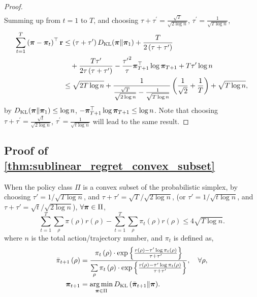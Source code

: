 \begin{proof}
\begin{equation*}
\begin{split}
\end{split}
\end{equation*}
Summing up from $t = 1$ to $T$, and choosing $\tau + \tau^\prime = \frac{\sqrt{T}}{\sqrt{2 \log{n}}}$, $\tau^\prime = \frac{1}{\sqrt{T \log{n}}}$,
\begin{equation*}
\begin{split}
    \sum\limits_{t=1}^{T}{\left( {\boldsymbol{\pi}} - {\boldsymbol{\pi}}_t \right)^\top {\mathbf{r}} } &\le \left(\tau + \tau^\prime\right) D_{\mathrm{KL}}{\left( {\boldsymbol{\pi}} \middle\| {\boldsymbol{\pi}}_1 \right)} + \frac{T}{2\left(\tau + \tau^\prime\right)} \\
    &\quad + \frac{T \tau^\prime}{2\tau \left(\tau + \tau^\prime\right)} - \frac{{\tau^\prime}^2}{\tau} {\boldsymbol{\pi}}_{T+1}^\top \log{{\boldsymbol{\pi}}_{T+1}} + T \tau^\prime \log{n} \\
    &\le \sqrt{2T \log{n}} + \frac{1}{\frac{\sqrt{T}}{\sqrt{2 \log{n}}} - \frac{1}{\sqrt{T\log{n}}}} \left( \frac{1}{\sqrt{2}}+ \frac{1}{T} \right) + \sqrt{T \log{n}},
\end{split}
\end{equation*}
by $D_{\mathrm{KL}}{\left( {\boldsymbol{\pi}} \middle\| {\boldsymbol{\pi}}_1 \right)} \le \log{n}$, $ - {\boldsymbol{\pi}}_{T+1}^\top \log{{\boldsymbol{\pi}}_{T+1}} \le \log{n}$. Note that choosing $\tau + \tau^\prime = \frac{\sqrt{t}}{\sqrt{2 \log{n}}}$, $\tau^\prime = \frac{1}{\sqrt{t \log{n}}}$ will lead to the same result.
\end{proof}

\subsection{Proof of \cref{thm:sublinear_regret_convex_subset}}

\begin{thm}
\label{thm:sublinear_regret_convex_subset}
When the policy class $\Pi$ is a convex subset of the probabilistic simplex, by choosing $\tau'=1/\sqrt{T\log{n}}$, and $\tau + \tau' = \sqrt{T} / \sqrt{2\log n}$, (or $\tau'=1/\sqrt{t\log{n}}$, and $\tau + \tau' = \sqrt{t} / \sqrt{2\log n}$), $\forall {\boldsymbol{\pi}} \in \Pi$,
\begin{equation*}
    \sum\limits_{t=1}^{T}{ \sum\limits_{\rho}{ \pi(\rho) r(\rho)}} - \sum\limits_{t=1}^{T}{ \sum\limits_{\rho}{ \pi_t(\rho) r(\rho)}} \le 4\sqrt{T\log n}.
\end{equation*}
where $n$ is the total action/trajectory number, and $\pi_{t}$ is defined as,
\begin{align*}
    \bar{\pi}_{t+1}\left( \rho \right) &= \frac{\pi_t\left( \rho \right) \cdot \exp\left\{ \frac{r\left( \rho \right) - \tau^\prime \log{\pi_t\left( \rho \right)}}{\tau + \tau^\prime} \right\}}{ \sum\limits_{\rho}{ \pi_t\left( \rho \right) \cdot \exp\left\{ \frac{r\left( \rho \right) - \tau^\prime \log{\pi_t\left( \rho \right)}}{\tau + \tau^\prime} \right\} } }, \quad \forall \rho, \\
    {\boldsymbol{\pi}}_{t+1} &= \operatorname*{arg\,min}\limits_{{\boldsymbol{\pi}} \in \Pi}{ D_{\mathrm{KL}}\left( \bar{{\boldsymbol{\pi}}}_{t+1} \middle\| {\boldsymbol{\pi}} \right) }.
\end{align*}
\end{thm}

